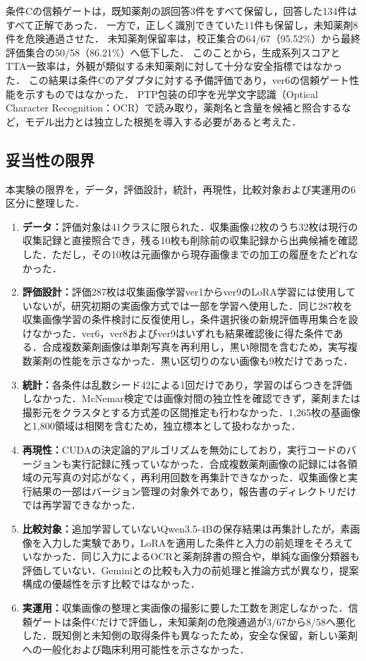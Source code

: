 \documentclass[uplatex,dvipdfmx]{jsarticle}
\begin{document}
条件Cの信頼ゲートは，既知薬剤の誤回答3件をすべて保留し，回答した134件はすべて正解であった．
一方で，正しく識別できていた11件も保留し，未知薬剤8件を危険通過させた．
未知薬剤保留率は，校正集合の64/67（95.52\%）から最終評価集合の50/58（86.21\%）へ低下した．
このことから，生成系列スコアとTTA一致率は，外観が類似する未知薬剤に対して十分な安全指標ではなかった．
この結果は条件Cのアダプタに対する予備評価であり，ver6の信頼ゲート性能を示すものではなかった．
PTP包装の印字を光学文字認識（Optical Character Recognition：OCR）で読み取り，薬剤名と含量を候補と照合するなど，モデル出力とは独立した根拠を導入する必要があると考えた．

\subsection{妥当性の限界}

本実験の限界を，データ，評価設計，統計，再現性，比較対象および実運用の6区分に整理した．

{\small
\begin{enumerate}
\setlength{\itemsep}{0pt}
  \item \textbf{データ：}評価対象は41クラスに限られた．収集画像42枚のうち32枚は現行の収集記録と直接照合でき，残る10枚も削除前の収集記録から出典候補を確認した．ただし，その10枚は元画像から現存画像までの加工の履歴をたどれなかった．
  \item \textbf{評価設計：}評価287枚は収集画像学習ver1からver9のLoRA学習には使用していないが，研究初期の実画像方式では一部を学習へ使用した．同じ287枚を収集画像学習の条件検討に反復使用し，条件選択後の新規評価専用集合を設けなかった．ver6，ver8およびver9はいずれも結果確認後に得た条件である．合成複数薬剤画像は単剤写真を再利用し，黒い隙間を含むため，実写複数薬剤の性能を示さなかった．黒い区切りのない画像も9枚だけであった．
  \item \textbf{統計：}各条件は乱数シード42による1回だけであり，学習のばらつきを評価しなかった．McNemar検定では画像対間の独立性を確認できず，薬剤または撮影元をクラスタとする方式差の区間推定も行わなかった．1,265枚の基画像と1,800領域は相関を含むため，独立標本として扱わなかった．
  \item \textbf{再現性：}CUDAの決定論的アルゴリズムを無効にしており，実行コードのバージョンも実行記録に残っていなかった．合成複数薬剤画像の記録には各領域の元写真の対応がなく，再利用回数を再集計できなかった．収集画像と実行結果の一部はバージョン管理の対象外であり，報告書のディレクトリだけでは再学習できなかった．
  \item \textbf{比較対象：}追加学習していないQwen3.5-4Bの保存結果は再集計したが，素画像を入力した実験であり，LoRAを適用した条件と入力の前処理をそろえていなかった．同じ入力によるOCRと薬剤辞書の照合や，単純な画像分類器も評価していない．Geminiとの比較も入力の前処理と推論方式が異なり，提案構成の優越性を示す比較ではなかった．
  \item \textbf{実運用：}収集画像の整理と実画像の撮影に要した工数を測定しなかった．信頼ゲートは条件Cだけで評価し，未知薬剤の危険通過が3/67から8/58へ悪化した．既知側と未知側の取得条件も異なったため，安全な保留，新しい薬剤への一般化および臨床利用可能性を示さなかった．
\end{enumerate}
}
\end{document}
